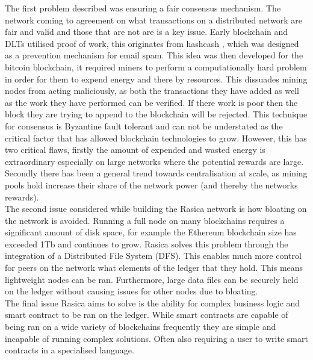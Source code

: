 The first problem described was ensuring a fair consensus mechanism. The network coming to agreement on what transactions on a distributed network are fair and valid and those that are not are is a key issue. Early blockchain and DLTs utilised proof of work, this originates from hashcash \cite{back2002hashcash}, which was designed as a prevention mechanism for email spam. This idea was then developed for the bitcoin blockchain, it required miners to perform a computationally hard problem in order for them to expend energy and there by resources. This dissuades mining nodes from acting maliciously, as both the transactions they have added as well as the work they have performed can be verified. If there work is poor then the block they are trying to append to the blockchain will be rejected. This technique for consensus is Byzantine fault tolerant and can not be understated as the critical factor that has allowed blockchain technologies to grow. However, this has two critical flaws, firstly the amount of expended and wasted energy is extraordinary especially on large networks where the potential rewards are large. Secondly there has been a general trend towards centralisation at scale, as mining pools hold increase their share of the network power (and thereby the networks rewards). \\

The second issue considered while building the Rasica network is how bloating on the network is avoided. Running a full node on many blockchains requires a significant amount of disk space, for example the Ethereum blockchain size has exceeded 1Tb \cite{EthBloat} and continues to grow. Rasica solves this problem through the integration of a Distributed File System (DFS). This enables much more control for peers on the network what elements of the ledger that they hold. This means lightweight nodes can be ran. Furthermore, large data files can be securely held on the ledger without causing issues for other nodes due to bloating. \\

The final issue Rasica aims to solve is the ability for complex business logic and smart contract to be ran on the ledger. While smart contracts are capable of being ran on a wide variety of blockchains frequently they are simple and incapable of running complex solutions. Often also requiring a user to write smart contracts in a specialised language. \\